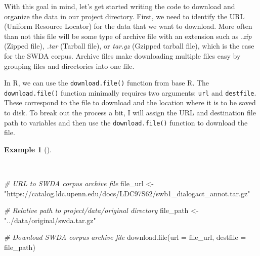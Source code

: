 \documentclass[
  letterpaper,
]{book}
\newenvironment{Shaded}{\begin{snugshade}}{\end{snugshade}}
\newcommand{\AttributeTok}[1]{\textcolor[rgb]{0.00,0.00,0.00}{#1}}
\newcommand{\CommentTok}[1]{\textcolor[rgb]{0.00,0.00,0.00}{\textit{#1}}}
\newcommand{\FunctionTok}[1]{\textcolor[rgb]{0.00,0.00,0.00}{#1}}
\newcommand{\NormalTok}[1]{\textcolor[rgb]{0.00,0.00,0.00}{#1}}
\newcommand{\OtherTok}[1]{\textcolor[rgb]{0.00,0.00,0.00}{#1}}
\newcommand{\StringTok}[1]{\textcolor[rgb]{0.00,0.00,0.00}{#1}}
\theoremstyle{definition}
\newtheorem{example}{Example}[chapter]
\theoremstyle{remark}
\begin{document}
With this goal in mind, let's get started writing the code to download
and organize the data in our project directory. First, we need to
identify the URL (Uniform Resource Locator) for the data that we want to
download. More often than not this file will be some type of archive
file with an extension such as \emph{.zip} (Zipped file), \emph{.tar}
(Tarball file), or \emph{tar.gz} (Gzipped tarball file), which is the
case for the SWDA corpus. Archive files make downloading multiple files
easy by grouping files and directories into one file.

In R, we can use the \texttt{download.file()} function from base R. The
\texttt{download.file()} function minimally requires two arguments:
\texttt{url} and \texttt{destfile}. These correspond to the file to
download and the location where it is to be saved to disk. To break out
the process a bit, I will assign the URL and destination file path to
variables and then use the \texttt{download.file()} function to download
the file.

\begin{example}[]\protect\hypertarget{exm-acquire-swda-download-file}{}\label{exm-acquire-swda-download-file}

~

\begin{Shaded}
\begin{Highlighting}[]
\CommentTok{\# URL to SWDA corpus archive file}
\NormalTok{file\_url }\OtherTok{\textless{}{-}}
  \StringTok{"https://catalog.ldc.upenn.edu/docs/LDC97S62/swb1\_dialogact\_annot.tar.gz"}

\CommentTok{\# Relative path to project/data/original directory}
\NormalTok{file\_path }\OtherTok{\textless{}{-}} \StringTok{"../data/original/swda.tar.gz"}

\CommentTok{\# Download SWDA corpus archive file}
\FunctionTok{download.file}\NormalTok{(}\AttributeTok{url =}\NormalTok{ file\_url, }\AttributeTok{destfile =}\NormalTok{ file\_path)}
\end{Highlighting}
\end{Shaded}

\end{example}
\end{document}
